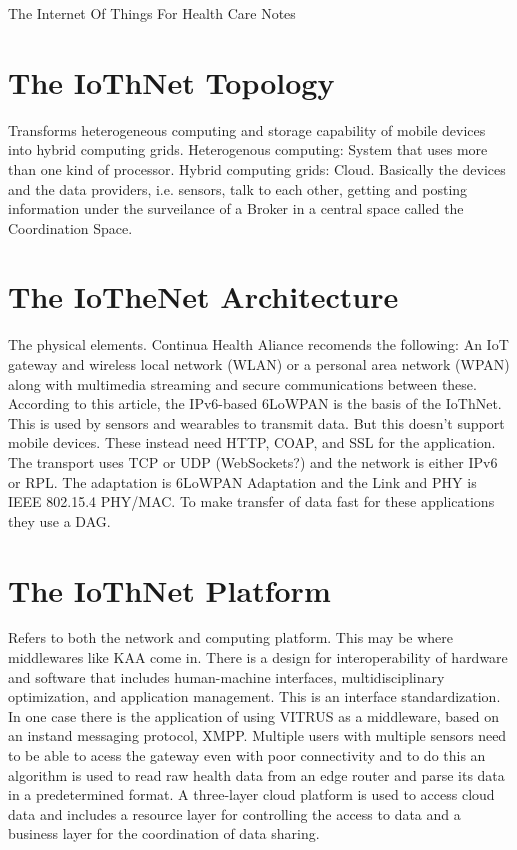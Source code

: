 \documentclass{article}
\begin{document}
\begin{center}
\LARGE The Internet Of Things For Health Care Notes
\end{center}
\section*{The IoThNet Topology}
Transforms heterogeneous computing and storage capability of mobile devices into hybrid 
computing grids.
Heterogenous computing: System that uses more than one kind of processor.
Hybrid computing grids: Cloud.
Basically the devices and the data providers, i.e. sensors, talk to each other, getting 
and posting information under the surveilance of a Broker in a central space called the
Coordination Space.

\section*{The IoTheNet Architecture}
The physical elements. Continua Health Aliance recomends the following: An IoT gateway and
wireless local network (WLAN) or a personal area network (WPAN) along with multimedia 
streaming and secure communications between these. According to this article, the 
IPv6-based 6LoWPAN is the basis of the IoThNet. This is used by sensors and wearables
to transmit data. But this doesn't support mobile devices. These instead need HTTP, COAP,
and SSL for the application. The transport uses TCP or UDP (WebSockets?) and the network
is either IPv6 or RPL. The adaptation is 6LoWPAN Adaptation and the Link and PHY is
IEEE 802.15.4 PHY/MAC.
To make transfer of data fast for these applications they use a DAG.

\section*{The IoThNet Platform}
Refers to both the network and computing platform. This may be where middlewares like
KAA come in. There is a design for interoperability of hardware and software that 
includes human-machine interfaces, multidisciplinary optimization, and application
management. This is an interface standardization. 
In one case there is the application of using VITRUS as a middleware, based on 
an instand messaging protocol, XMPP. Multiple users with multiple sensors need to be 
able to acess the gateway even with poor connectivity and to do this an algorithm is 
used to read raw health data from an edge router and parse its data in a predetermined
format. A three-layer cloud platform is used to access cloud data and includes a resource
layer for controlling the access to data and a business layer for the coordination of data
sharing.
\end{document}
